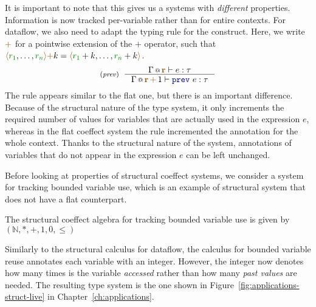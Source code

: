 It is important to note that this gives us a systems with \emph{different} properties.
Information is now tracked per-variable rather than for entire contexts. For dataflow,
we also need to adapt the typing rule for the  construct. Here, we write $\aclrd{+}$
for a pointwise extension of the $+$ operator, such that
$\alift{\cclrd{r_1}, \ldots, \cclrd{r_n}} \aclrd{+} k = \alift{\cclrd{r_1} + k, \ldots, \cclrd{r_n} + k}$.
%
\begin{equation*}
\tyrule{prev}
  { \coctx{\Gamma}{\aclrd{\textbf{r}}} \vdash e : \tau }
  { \coctx{\Gamma}{\aclrd{\textbf{r}} \,\aclrd{+}\, 1} \vdash \kvd{prev}~e : \tau }
\end{equation*}
%
The rule appears similar to the flat one, but there is an important difference. Because of the
structural nature of the type system, it only increments the required number of values for
variables that are actually used in the expression $e$, whereas in the flat coeffect system the rule
incremented the annotation for the whole context. Thanks to the structural nature of the system,
annotations of variables that do not appear in the expression $e$ can be left unchanged.

Before looking at properties of structural coeffect systems,
we consider a system for tracking bounded variable use, which is an example of structural system
that does not have a flat counterpart.

\begin{example}
\label{ex:structural-ex-bll}
The structural coeffect algebra for tracking bounded variable use is given by
$(\mathbb{N}, \ast, +, 1, 0, \leq)$
\end{example}

\noindent
Similarly to the structural calculus for dataflow, the calculus for bounded variable reuse
annotates each variable with an integer. However, the integer now denotes how many times is the variable
\emph{accessed} rather than how many \emph{past values} are needed. The resulting type system is
the one shown in Figure~\ref{fig:applications-struct-live} in Chapter~\ref{ch:applications}.



%
%



